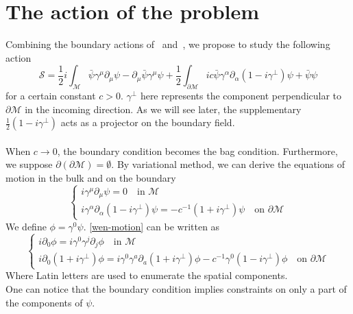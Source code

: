 \section{The action of the problem}
Combining the boundary actions of~\cite{Henningson1998} and~\cite{Contino2005}, we propose to study the following action
\begin{equation}\label{wen-action}
\mathcal{S} = \frac{1}{2}i\int_{\mathcal{M}} \bar{\psi} \gamma^\mu \partial_\mu \psi - \partial_\mu \bar{\psi} \gamma^\mu \psi 
+ \frac{1}{2}\int_{\partial \mathcal{M}} ic \bar{\psi} \gamma^\alpha \partial_\alpha (1 - i \gamma^\bot) \psi
+ \bar{\psi} \psi
\end{equation}
for a certain constant $c >0$. 
$\gamma^\bot$ here represents the component perpendicular to $\partial \mathcal{M}$ in the incoming direction. 
As we will see later, the supplementary $\frac 1 2 (1-i\gamma^\bot)$ acts as a projector on the boundary field.
\\\\
When $c \rightarrow 0$, the boundary condition becomes the bag condition. 
Furthermore, we suppose $\partial(\partial \mathcal{M}) = \emptyset$.
By variational method, we can derive the equations of motion in the bulk and on the boundary
\begin{equation}\label{wen-motion}
\begin{cases}
i \gamma^\mu \partial_\mu \psi = 0  \quad \textrm{in $\mathcal{M}$}\\
i \gamma^\alpha \partial_\alpha (1 - i\gamma^\bot) \psi = - c^{-1}(1 + i\gamma^{\bot}) \psi \quad \textrm{on $\partial \mathcal{M}$}
\end{cases}
\end{equation}
We define $\phi = \gamma^0 \psi$. 
\cref{wen-motion} can be written as 
\begin{equation}\label{wen-maineq}
\begin{cases}
i \partial_0 \phi = i \gamma^0 \gamma^j \partial_j \phi   \quad \textrm{in $\mathcal{M}$}\\
i \partial_0(1 + i\gamma^\bot) \phi = i\gamma^0 \gamma^a \partial_a (1+ i\gamma^\bot)\phi - c^{-1} \gamma^0(1 - i \gamma^{\bot})\phi \quad \textrm{on $\partial \mathcal{M}$}
\end{cases}
\end{equation}
Where Latin letters are used to enumerate the spatial components.\\
One can notice that the boundary condition implies constraints on only a part of the components of $\psi$. 
